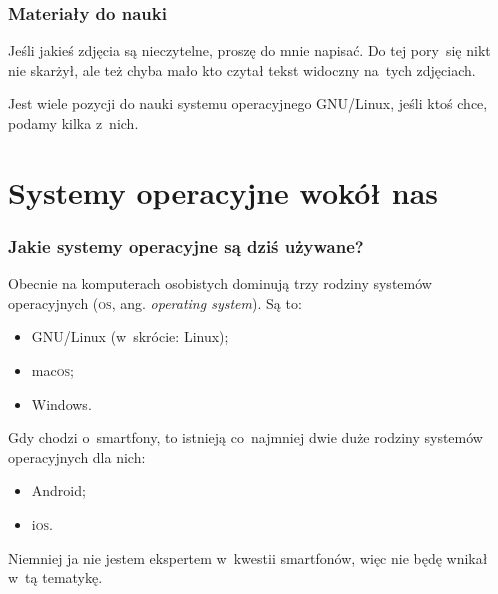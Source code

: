 \documentclass[10pt,t]{beamer}
\begin{document}
\begin{frame}
  \frametitle{Materiały do nauki}


  Jeśli jakieś zdjęcia są nieczytelne, proszę do mnie napisać. Do tej
  pory~się nikt nie skarżył, ale też chyba mało kto czytał tekst widoczny
  na~tych zdjęciach.

  Jest wiele pozycji do nauki systemu operacyjnego GNU/Linux, jeśli ktoś
  chce, podamy kilka z~nich.

\end{frame}










\section{Systemy operacyjne wokół nas}


\begin{frame}
  \frametitle{Jakie systemy operacyjne są dziś używane?}


  Obecnie na komputerach osobistych dominują trzy rodziny systemów
  operacyjnych (\textsc{os}, ang. \textit{operating system}). Są to:
  \begin{itemize}

  \item GNU/Linux (w~skrócie: Linux);

  \item mac\textsc{os};

  \item Windows.

  \end{itemize}

  Gdy chodzi o~smartfony, to istnieją co~najmniej dwie duże rodziny systemów
  operacyjnych dla nich:
  \begin{itemize}

  \item Android;

  \item i\textsc{os}.

  \end{itemize}
  Niemniej ja nie jestem ekspertem w~kwestii smartfonów, więc nie będę
  wnikał w~tą tematykę.


\end{frame}
\end{document}
